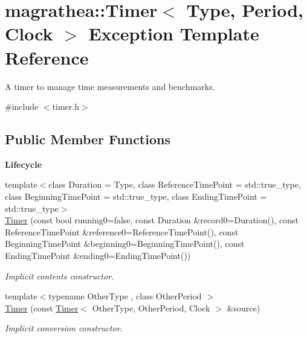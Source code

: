 \hypertarget{exceptionmagrathea_1_1Timer}{\section{magrathea\-:\-:Timer$<$ Type, Period, Clock $>$ Exception Template Reference}
\label{exceptionmagrathea_1_1Timer}
}


A timer to manage time measurements and benchmarks.  




{\ttfamily \#include $<$timer.\-h$>$}

\subsection*{Public Member Functions}
\begin{Indent}{\bf Lifecycle}\par
\begin{DoxyCompactItemize}
\item 
{\footnotesize template$<$class Duration  = Type, class Reference\-Time\-Point  = std\-::true\-\_\-type, class Beginning\-Time\-Point  = std\-::true\-\_\-type, class Ending\-Time\-Point  = std\-::true\-\_\-type$>$ }\\\hyperlink{exceptionmagrathea_1_1Timer_a48652f7ff9a46b997f857375b83da6f5}{Timer} (const bool running0=false, const Duration \&record0=Duration(), const Reference\-Time\-Point \&reference0=Reference\-Time\-Point(), const Beginning\-Time\-Point \&beginning0=Beginning\-Time\-Point(), const Ending\-Time\-Point \&ending0=Ending\-Time\-Point())
\begin{DoxyCompactList}\small\item\em Implicit contents constructor. \end{DoxyCompactList}\item 
{\footnotesize template$<$typename Other\-Type , class Other\-Period $>$ }\\\hyperlink{exceptionmagrathea_1_1Timer_afd27dbe98da7c62058bf01f5a8b294b8}{Timer} (const \hyperlink{exceptionmagrathea_1_1Timer}{Timer}$<$ Other\-Type, Other\-Period, Clock $>$ \&source)
\begin{DoxyCompactList}\small\item\em Implicit conversion constructor. \end{DoxyCompactList}\end{DoxyCompactItemize}
\end{Indent}
